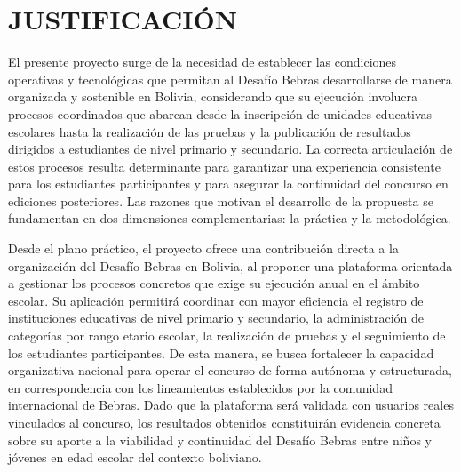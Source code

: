 \clearpage

\section{JUSTIFICACIÓN}

    El presente proyecto surge de la necesidad de establecer las condiciones operativas y tecnológicas que permitan al Desafío Bebras desarrollarse de manera organizada y sostenible en Bolivia, considerando que su ejecución involucra procesos coordinados que abarcan desde la inscripción de unidades educativas escolares hasta la realización
    de las pruebas y la publicación de resultados dirigidos a estudiantes de nivel primario y secundario. La correcta articulación de estos procesos resulta determinante para garantizar una experiencia consistente para los estudiantes participantes y para asegurar la continuidad del concurso en ediciones posteriores. Las razones que motivan el desarrollo de la propuesta se fundamentan en dos dimensiones complementarias: la práctica y la metodológica.

    Desde el plano práctico, el proyecto ofrece una contribución directa a la organización del Desafío Bebras en Bolivia, al proponer una plataforma orientada a gestionar los procesos concretos que exige su ejecución anual en el ámbito escolar. Su aplicación permitirá coordinar con mayor eficiencia el registro de instituciones educativas de nivel primario y
    secundario, la administración de categorías por rango etario escolar, la realización de pruebas y el seguimiento de los estudiantes participantes. De esta manera, se busca fortalecer la capacidad organizativa nacional para operar el concurso de forma autónoma y estructurada, en correspondencia con los lineamientos establecidos por la comunidad internacional de Bebras. Dado que la plataforma será validada con usuarios reales vinculados al concurso, los resultados obtenidos constituirán evidencia concreta sobre su aporte a la viabilidad y continuidad del Desafío Bebras entre niños y jóvenes en edad escolar del contexto boliviano.

